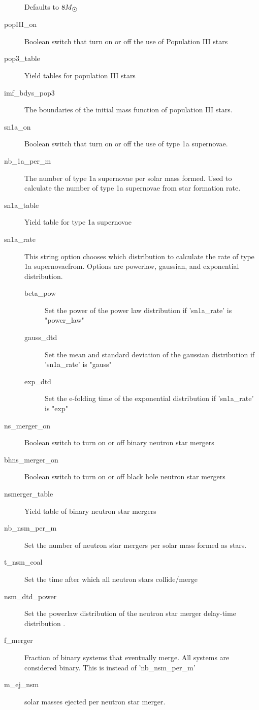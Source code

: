 \begin{description}
  Defaults to $8\msol$
\item[popIII\_on] Boolean switch that turn on or off the use of Population III stars
\item[pop3\_table] Yield tables for population III stars
\item[imf\_bdys\_pop3] The boundaries of the initial mass function of population III stars.
\item[sn1a\_on] Boolean switch that turn on or off the use of type 1a supernovae.
\item[nb\_1a\_per\_m] The number of type 1a supernovae per solar mass formed.
  Used to calculate the number of type 1a supernovae from star formation rate.
\item[sn1a\_table] Yield table for type 1a supernovae
\item[sn1a\_rate] This string option chooses which distribution to calculate the rate of type 1a supernovaefrom.
  Options are powerlaw, gaussian, and exponential distribution.
  \begin{description}
  \item[beta\_pow] Set the power of the power law distribution if 'sn1a\_rate' is "power\_law" 
  \item[gauss\_dtd] Set the mean and standard deviation of the gaussian distribution if 'sn1a\_rate' is "gauss" 
  \item[exp\_dtd] Set the e-folding time of the exponential distribution if 'sn1a\_rate' is "exp"
  \end{description}
\item[ns\_merger\_on] Boolean switch to turn on or off binary neutron star mergers
\item[bhns\_merger\_on] Boolean switch to turn on or off black hole neutron star mergers
\item[nsmerger\_table] Yield table of binary neutron star mergers
\item[nb\_nsm\_per\_m] Set the number of neutron star mergers per solar mass formed as stars.
\item[t\_nsm\_coal] Set the time after which all neutron stars collide/merge
\item[nsm\_dtd\_power] Set the powerlaw distribution of the neutron star merger delay-time distribution .
\item[f\_merger] Fraction of binary systems that eventually merge. All systems are considered binary. This is instead of 'nb\_nsm\_per\_m'
\item[m\_ej\_nsm] solar masses ejected per neutron star merger.
\end{description}

\newpage
